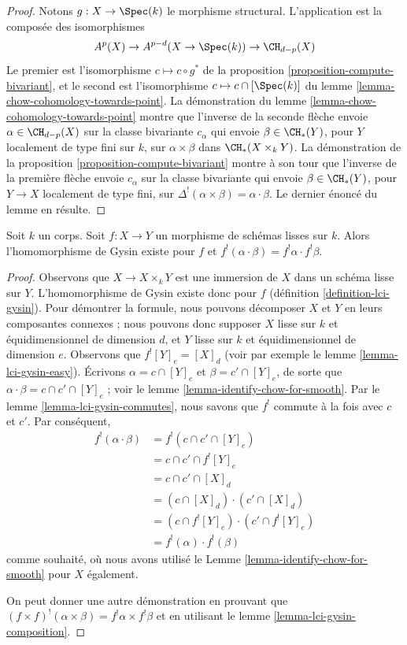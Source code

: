 \begin{proof}
Notons $g : X \to \Spec(k)$ le morphisme structural.
L'application est la composée des isomorphismes
$$
A^p(X) \to A^{p - d}(X \to \Spec(k)) \to \CH_{d - p}(X)
$$
Le premier est l'isomorphisme $c \mapsto c \circ g^*$ de la
proposition \ref{proposition-compute-bivariant},
et le second est l'isomorphisme $c \mapsto c \cap [\Spec(k)]$ du
lemme \ref{lemma-chow-cohomology-towards-point}.
La démonstration du lemme \ref{lemma-chow-cohomology-towards-point}
montre que l'inverse de la seconde flèche envoie $\alpha \in \CH_{d - p}(X)$
sur la classe bivariante $c_\alpha$ qui envoie $\beta \in \CH_*(Y)$,
pour $Y$ localement de type fini sur $k$,
sur $\alpha \times \beta$ dans $\CH_*(X \times_k Y)$. La démonstration de la
proposition \ref{proposition-compute-bivariant} montre à son tour que l'inverse
de la première flèche envoie $c_\alpha$ sur la classe bivariante
qui envoie $\beta \in \CH_*(Y)$, pour $Y \to X$ localement de type fini,
sur $\Delta^!(\alpha \times \beta) = \alpha \cdot \beta$.
Le dernier énoncé du lemme en résulte.
\end{proof}

\begin{lemma}
\label{lemma-lci-gysin-product}
Soit $k$ un corps. Soit $f : X \to Y$ un morphisme de schémas lisses
sur $k$. Alors l'homomorphisme de Gysin existe pour $f$ et
$f^!(\alpha \cdot \beta) = f^!\alpha \cdot f^!\beta$.
\end{lemma}

\begin{proof}
Observons que $X \to X \times_k Y$ est une immersion de $X$ dans un schéma
lisse sur $Y$. L'homomorphisme de Gysin existe donc pour $f$
(définition \ref{definition-lci-gysin}).
Pour démontrer la formule, nous pouvons décomposer $X$ et $Y$ en leurs
composantes connexes ; nous pouvons donc supposer $X$ lisse sur $k$
et équidimensionnel de dimension $d$, et $Y$ lisse sur $k$
et équidimensionnel de dimension $e$. Observons que
$f^![Y]_e = [X]_d$ (voir par exemple le lemme \ref{lemma-lci-gysin-easy}).
Écrivons $\alpha = c \cap [Y]_e$ et $\beta = c' \cap [Y]_e$,
de sorte que $\alpha \cdot \beta = c \cap c' \cap [Y]_e$ ;
voir le lemme \ref{lemma-identify-chow-for-smooth}.
Par le lemme \ref{lemma-lci-gysin-commutes}, nous savons que $f^!$
commute à la fois avec $c$ et $c'$. Par conséquent,
\begin{align*}
f^!(\alpha \cdot \beta)
& =
f^!(c \cap c' \cap [Y]_e) \\
& =
c \cap c' \cap f^![Y]_e \\
& =
c \cap c' \cap [X]_d \\
& =
(c \cap [X]_d) \cdot (c' \cap [X]_d) \\
& =
(c \cap f^![Y]_e) \cdot (c' \cap f^![Y]_e) \\
& =
f^!(\alpha) \cdot f^!(\beta)
\end{align*}
comme souhaité, où nous avons utilisé le Lemme \ref{lemma-identify-chow-for-smooth}
pour $X$ également.

\medskip\noindent
On peut donner une autre démonstration en prouvant que
$(f \times f)^!(\alpha \times \beta) = f^!\alpha \times f^!\beta$
et en utilisant le lemme \ref{lemma-lci-gysin-composition}.
\end{proof}

